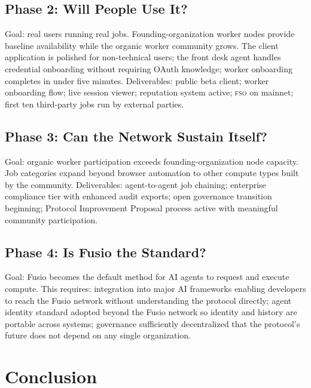 \documentclass[10pt,twocolumn]{article}
\newcommand{\fso}{\textsc{fso}}
\begin{document}
\subsection{Phase 2: Will People Use It?}

Goal: real users running real jobs. Founding-organization worker nodes provide baseline availability while the organic worker community grows. The client application is polished for non-technical users; the front desk agent handles credential onboarding without requiring OAuth knowledge; worker onboarding completes in under five minutes. Deliverables: public beta client; worker onboarding flow; live session viewer; reputation system active; \fso{} on mainnet; first ten third-party jobs run by external parties.

\subsection{Phase 3: Can the Network Sustain Itself?}

Goal: organic worker participation exceeds founding-organization node capacity. Job categories expand beyond browser automation to other compute types built by the community. Deliverables: agent-to-agent job chaining; enterprise compliance tier with enhanced audit exports; open governance transition beginning; Protocol Improvement Proposal process active with meaningful community participation.

\subsection{Phase 4: Is Fusio the Standard?}

Goal: Fusio becomes the default method for AI agents to request and execute compute. This requires: integration into major AI frameworks enabling developers to reach the Fusio network without understanding the protocol directly; agent identity standard adopted beyond the Fusio network so identity and history are portable across systems; governance sufficiently decentralized that the protocol's future does not depend on any single organization.

\section{Conclusion}
\label{sec:conclusion}
\end{document}

